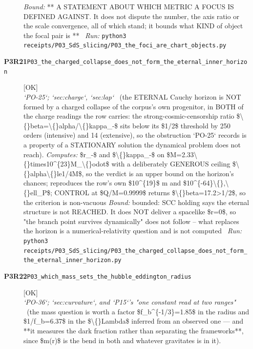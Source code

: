 \begin{description}
 \emph{Bound:} ** A STATEMENT ABOUT WHICH METRIC A FOCUS IS DEFINED AGAINST. It does not dispute the number, the axis ratio or the scale convergence, all of which stand; it bounds what KIND of object the focal pair is **
\ \emph{Run:} \texttt{python3 receipts/P03\_SdS\_slicing/P03\_the\_foci\_are\_chart\_objects.py}
\item[\rcptlabel{P03_the_charged_collapse_does_not_form_the_eternal_inner_horizon}{P3R21}\textbf{P3R21}\quad\texttt{P03\_the\_charged\_collapse\_does\_not\_form\_the\_eternal\_inner\_horizon}]\hfill\textsf{[OK]}\\
\textit{`PO-25`; `sec:charge`, `sec:lap`} \ (the ETERNAL Cauchy horizon is NOT formed by a charged collapse of the corpus's own progenitor, in BOTH of the charge readings the row carries: the strong-cosmic-censorship ratio \$\textbackslash\{\}beta=\textbackslash\{\}alpha/\textbackslash\{\}kappa\_-\$ sits below its \$1/2\$ threshold by 250 orders (intensive) and 14 (extensive), so the obstruction `PO-25` records is a property of a STATIONARY solution the dynamical problem does not reach). 
\emph{Computes:} \$r\_-\$ and \$\textbackslash\{\}kappa\_-\$ on \$M=2.33\textbackslash\{\}times10\textasciicircum{}\{23\}M\_\textbackslash\{\}odot\$ with a deliberately GENEROUS ceiling \$\textbackslash\{\}alpha\textbackslash\{\}le1/4M\$, so the verdict is an upper bound on the horizon's chances; reproduces the row's own \$10\textasciicircum{}\{19\}\$ m and \$10\textasciicircum{}\{-64\}\textbackslash\{\},\textbackslash\{\}ell\_P\$; CONTROL at \$Q/M=0.9999\$ returns \$\textbackslash\{\}beta=17.2>1/2\$, so the criterion is non-vacuous
 \emph{Bound:} bounded: SCC holding says the eternal structure is not REACHED. It does NOT deliver a spacelike \$r=0\$, so "the branch point survives dynamically" does not follow -- what replaces the horizon is a numerical-relativity question and is not computed
\ \emph{Run:} \texttt{python3 receipts/P03\_SdS\_slicing/P03\_the\_charged\_collapse\_does\_not\_form\_the\_eternal\_inner\_horizon.py}
\item[\rcptlabel{P03_which_mass_sets_the_hubble_eddington_radius}{P3R22}\textbf{P3R22}\quad\texttt{P03\_which\_mass\_sets\_the\_hubble\_eddington\_radius}]\hfill\textsf{[OK]}\\
\textit{`PO-36`; `sec:curvature`, and `P15`'s "one constant read at two ranges"} \ (the mass question is worth a factor \$f\_b\textasciicircum{}\{-1/3\}=1.85\$ in the radius and \$1/f\_b=6.37\$ in the \$\textbackslash\{\}Lambda\$ inferred from an observed one --- and **it measures the dark fraction rather than separating the frameworks**, since \$m(r)\$ is the bend in both and whatever gravitates is in it). 

\end{description}
